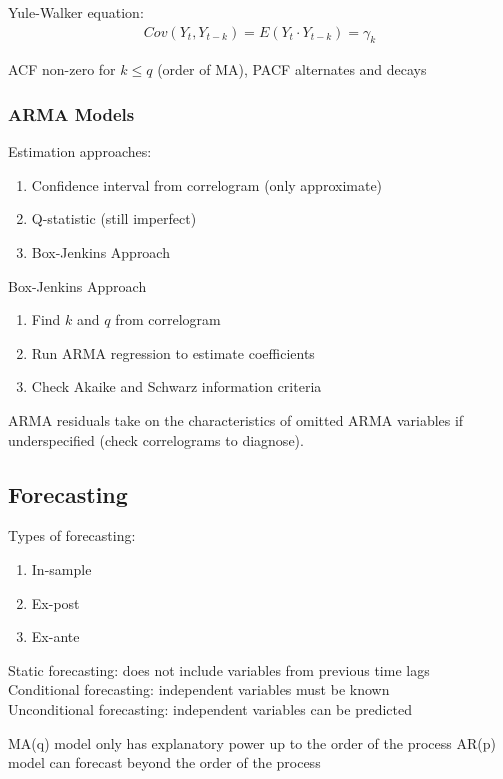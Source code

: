 \documentclass[12pt]{article}
\numberwithin{equation}{section}
\begin{document}
Yule-Walker equation:
\begin{gather}
    Cov(Y_t,Y_{t-k}) = E(Y_t \cdot Y_{t-k}) = \gamma_k
\end{gather}

ACF non-zero for $k \leq q$ (order of MA), PACF alternates and decays

\subsubsection{ARMA Models}

Estimation approaches:
\begin{enumerate}
    \item Confidence interval from correlogram (only approximate)
    \item Q-statistic (still imperfect)
    \item Box-Jenkins Approach
\end{enumerate}

Box-Jenkins Approach
\begin{enumerate}
    \item Find $k$ and $q$ from correlogram
    \item Run ARMA regression to estimate coefficients
    \item Check Akaike and Schwarz information criteria
\end{enumerate}

ARMA residuals take on the characteristics of omitted ARMA variables if underspecified (check correlograms to diagnose).

\subsection{Forecasting}

Types of forecasting:
\begin{enumerate}
    \item In-sample
    \item Ex-post
    \item Ex-ante
\end{enumerate}

Static forecasting: does not include variables from previous time lags \\
Conditional forecasting: independent variables must be known \\
Unconditional forecasting: independent variables can be predicted

MA(q) model only has explanatory power up to the order of the process
AR(p) model can forecast beyond the order of the process
\end{document}

